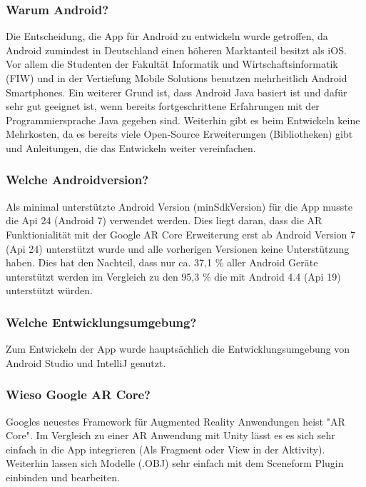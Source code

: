 \documentclass{scrartcl}
\begin{document}
\subsubsection{Warum Android?}

Die Entscheidung, die App für Android zu entwickeln wurde getroffen, da Android zumindest in Deutschland einen höheren Marktanteil besitzt als iOS. Vor allem die Studenten der Fakultät Informatik und Wirtschaftsinformatik (FIW) und in der Vertiefung Mobile Solutions benutzen mehrheitlich Android Smartphones. Ein weiterer Grund ist, dass Android Java basiert ist und dafür sehr gut geeignet ist, wenn bereits fortgeschrittene Erfahrungen mit der Programmiersprache Java gegeben sind. Weiterhin gibt es beim Entwickeln keine Mehrkosten, da es bereits viele Open-Source Erweiterungen (Bibliotheken) gibt und Anleitungen, die das Entwickeln weiter vereinfachen.

\subsubsection{Welche Androidversion?}

Als minimal unterstützte Android Version (minSdkVersion) für die App musste die Api 24 (Android 7) verwendet werden. Dies liegt daran, dass die AR Funktionialität mit der Google AR Core Erweiterung erst ab Android Version 7 (Api 24) unterstützt wurde und alle vorherigen Versionen keine Unterstützung haben. Dies hat den Nachteil, dass nur ca. 37,1 \% aller Android Geräte unterstützt werden im Vergleich zu den 95,3 \% die mit Android 4.4 (Api 19) unterstützt würden. 

\subsubsection{Welche Entwicklungsumgebung?}

Zum Entwickeln der App wurde hauptsächlich die Entwicklungsumgebung von Android Studio und IntelliJ genutzt.

\subsubsection{Wieso Google AR Core?}

Googles neuestes Framework für Augmented Reality Anwendungen heist "AR Core". Im Vergleich zu einer AR Anwendung mit Unity lässt es es sich sehr einfach in die App integrieren (Als Fragment oder View in der Aktivity). Weiterhin lassen sich Modelle (.OBJ) sehr einfach mit dem Sceneform Plugin einbinden und bearbeiten. 
\end{document}
